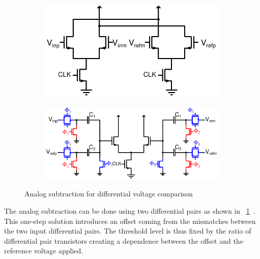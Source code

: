 \begin{figure}[htp]
	\centering
	\begin{subfigure}[b]{0.44\textwidth}
        \includegraphics[width=\textwidth]{Chapter7/Figs/sumanen_dblDiffPair}
        \label{fig:cmp_dbl_diff_sumanen}
    \end{subfigure}
    \begin{subfigure}[b]{0.54\textwidth}
        \includegraphics[width=\textwidth]{Chapter7/Figs/sumanen_sc_ref}
        \label{fig:cmp_sc_diff_sumanen}
    \end{subfigure}
	\caption{Analog subtraction for differential voltage comparison}
	\label{fig:cmp_analog_sub}
\end{figure}

The analog subtraction can be done using two differential pairs as shown in \figurename~\ref{fig:cmp_dbl_diff_sumanen}~\cite{Sumanen2000}. This one-step solution introduces an offset coming from the mismatches between the two input differential pairs. The threshold level is thus fixed by the ratio of differential pair transistors creating a dependence between the offset and the reference voltage applied.

